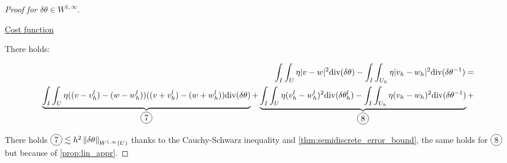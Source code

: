 \documentclass[english,a4paper,9pt,oneside]{scrbook}	%
\theoremstyle{break}
\newenvironment{mproof}[1][\proofname]{%
  \begin{proof}[#1]$ $\par\nobreak\ignorespaces
}{%
  \end{proof}
}
\renewcommand*{\proofname}{Proof}
\theoremstyle{remark}
\newcommand{\ds}{\displaystyle}
\newcommand{\norm}[1]{\left\lVert#1\right\rVert}
\newcommand{\te}{\theta}
\newcommand{\dive}{\text{div}}
\newcommand*\circled[1]{\tikz[baseline=(char.base)]{
            \node[shape=circle,draw,inner sep=2pt] (char) {#1};}}
\begin{document}
\begin{mproof}[Proof for $\delta \te \in W^{1,\infty}$]
%
%
%
%

\underline{Cost function}

There holds:

\begin{align*}
	\int_I \int_U \eta |v-w|^2 \dive(\delta \te) - \int_I \int_{U_h} \eta |v_h-w_h|^2\dive(\delta \te^{-1})=\\
	\underbrace{\int_I\int_U\eta((v-v_h^l)-(w-w_h^l))((v+v_h^l)-(w+w_h^l))\dive(\delta \te)}_{\circled{7}} + \underbrace{\int_I\int_U\eta(v_h^l-w_h^l)^2\dive(\delta \te_h^l)-\int_I\int_{U_h}\eta (v_h-w_h)^2\dive(\delta \te^{-1})}_{\circled{8}}+\\
\end{align*}



There holds $\circled{7} \lesssim h^2\norm{\delta \te}_{W^{1,\infty}(U)}$ thanks to the Cauchy-Schwarz inequality and \cref{thm:semidiscrete_error_bound}, the same holds for $\circled{8}$ but because of \cref{prop:lin_appr}.
\end{mproof}
\end{document}
